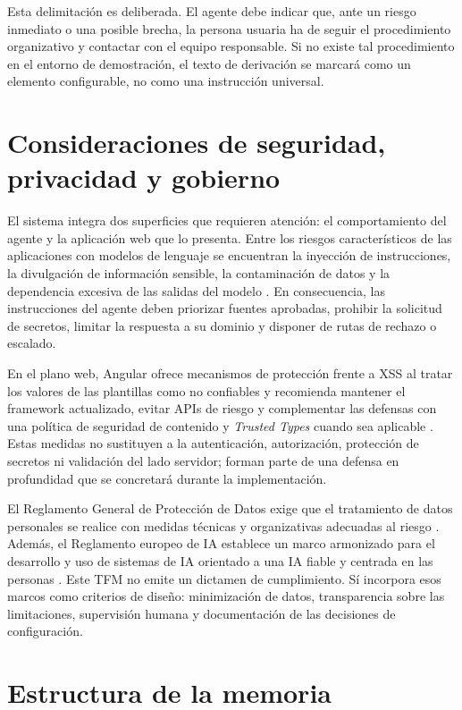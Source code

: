 Esta delimitación es deliberada. El agente debe indicar que, ante un riesgo
inmediato o una posible brecha, la persona usuaria ha de seguir el procedimiento
organizativo y contactar con el equipo responsable. Si no existe tal
procedimiento en el entorno de demostración, el texto de derivación se marcará
como un elemento configurable, no como una instrucción universal.

\section{Consideraciones de seguridad, privacidad y gobierno}
\label{sec:consideraciones-intro}

El sistema integra dos superficies que requieren atención: el comportamiento del
agente y la aplicación web que lo presenta. Entre los riesgos característicos de
las aplicaciones con modelos de lenguaje se encuentran la inyección de
instrucciones, la divulgación de información sensible, la contaminación de datos
y la dependencia excesiva de las salidas del modelo \cite{owaspLlm2026}. En
consecuencia, las instrucciones del agente deben priorizar fuentes aprobadas,
prohibir la solicitud de secretos, limitar la respuesta a su dominio y disponer
de rutas de rechazo o escalado.

En el plano web, Angular ofrece mecanismos de protección frente a XSS al tratar
los valores de las plantillas como no confiables y recomienda mantener el
framework actualizado, evitar APIs de riesgo y complementar las defensas con una
política de seguridad de contenido y \emph{Trusted Types} cuando sea aplicable
\cite{angularSecurity}. Estas medidas no sustituyen a la autenticación,
autorización, protección de secretos ni validación del lado servidor; forman
parte de una defensa en profundidad que se concretará durante la implementación.

El Reglamento General de Protección de Datos exige que el tratamiento de datos
personales se realice con medidas técnicas y organizativas adecuadas al riesgo
\cite{gdpr}. Además, el Reglamento europeo de IA establece un marco armonizado
para el desarrollo y uso de sistemas de IA orientado a una IA fiable y centrada
en las personas \cite{aiAct}. Este TFM no emite un dictamen de cumplimiento.
Sí incorpora esos marcos como criterios de diseño: minimización de datos,
transparencia sobre las limitaciones, supervisión humana y documentación de las
decisiones de configuración.

\section{Estructura de la memoria}
\label{sec:estructura-memoria}

